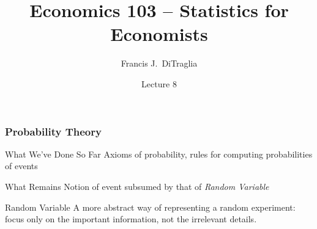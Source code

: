 \documentclass[handout]{beamer}
\title[Econ 103]{Economics 103 -- Statistics for Economists}
\author[F. DiTraglia]{Francis J.\ DiTraglia}
\institute{University of Pennsylvania}
\date{Lecture 8}
\begin{document}
 





\begin{frame}[plain]
	\titlepage 
	

\end{frame} 

\begin{frame}
\frametitle{Probability Theory}


\begin{block}{What We've Done So Far}
Axioms of probability, rules for computing probabilities of events
\end{block}

\begin{block}{What Remains}
Notion of event subsumed by that of \emph{\alert{Random Variable}}
\end{block}
\begin{block}{Random Variable}
	A more abstract way of representing a random experiment: focus only on the important information, not the irrelevant details.
\end{block}


\end{frame}
%
% 
%
%  
%  
\end{document}
